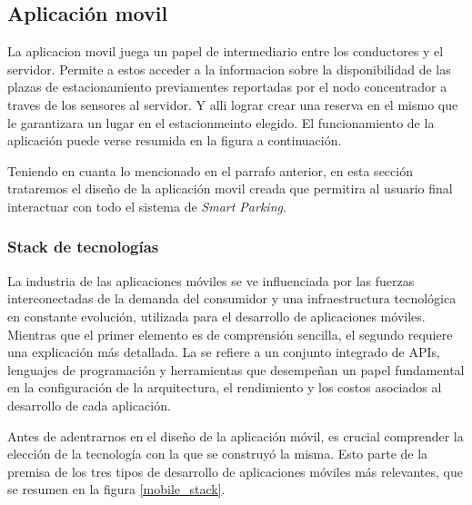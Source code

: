 \clearpage

\subsection{Aplicación movil} \label{title:mobile_aplication}

La aplicacion movil juega un papel de intermediario entre los conductores y el servidor. Permite a estos acceder a la informacion sobre la disponibilidad de las plazas de estacionamiento previamentes reportadas por el nodo concentrador a traves de los sensores al servidor. Y alli lograr crear una reserva en el mismo que le garantizara un lugar en el estacionmeinto elegido. El funcionamiento de la aplicación puede verse resumida en la figura a continuación.


Teniendo en cuanta lo mencionado en el parrafo anterior, en esta sección trataremos el diseño de la aplicación movil creada que permitira al usuario final interactuar con todo el sistema de \textit{Smart Parking}.

\subsubsection{Stack de tecnologías}
La industria de las aplicaciones móviles se ve influenciada por las fuerzas interconectadas de la demanda del consumidor y una infraestructura tecnológica en constante evolución, utilizada para el desarrollo de aplicaciones móviles. Mientras que el primer elemento es de comprensión sencilla, el segundo requiere una explicación más detallada. La  se refiere a un conjunto integrado de APIs, lenguajes de programación y herramientas que desempeñan un papel fundamental en la configuración de la arquitectura, el rendimiento y los costos asociados al desarrollo de cada aplicación.

Antes de adentrarnos en el diseño de la aplicación móvil, es crucial comprender la elección de la tecnología con la que se construyó la misma. Esto parte de la premisa de los tres tipos de desarrollo de aplicaciones móviles más relevantes, que se resumen en la figura \ref{mobile_stack}.


